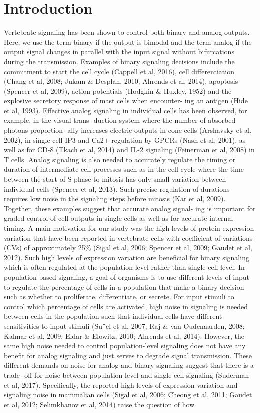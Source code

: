 \section{Introduction}
Vertebrate signaling has been shown to control both binary and analog outputs. Here, we use the term binary if the output is bimodal and the term analog if the output signal changes in parallel with the input signal without bifurcations during the transmission. Examples of binary signaling decisions include the commitment to start the cell cycle (Cappell et al, 2016), cell differentiation (Chang et al, 2008; Jukam & Desplan, 2010; Ahrends et al, 2014), apoptosis
(Spencer et al, 2009), action potentials (Hodgkin & Huxley, 1952) and the explosive secretory response of mast cells when encounter- ing an antigen (Hide et al, 1993). Effective analog signaling in individual cells has been observed, for example, in the visual trans- duction system where the number of absorbed photons proportion- ally increases electric outputs in cone cells (Arshavsky et al, 2002), in single-cell IP3 and Ca2+ regulation by GPCRs (Nash et al, 2001), as well as for CD-8 (Tkach et al, 2014) and IL-2 signaling (Feinerman et al, 2008) in T cells. Analog signaling is also needed to accurately regulate the timing or duration of intermediate cell processes such as in the cell cycle where the time between the start of S-phase to mitosis has only small variation between individual cells (Spencer et al, 2013). Such precise regulation of durations requires low noise in the signaling steps before mitosis (Kar et al, 2009). Together, these examples suggest that accurate analog signal- ing is important for graded control of cell outputs in single cells as well as for accurate internal timing. A main motivation for our study was the high levels of protein expression variation that have been reported in vertebrate cells with coefficient of variations (CVs) of approximately 25\% (Sigal et al, 2006; Spencer et al, 2009; Gaudet et al, 2012). Such high levels of expression variation are beneficial for binary signaling which is often regulated at the population level rather than single-cell level. In population-based signaling, a goal of organisms is to use different levels of input to regulate the percentage of cells in a population that make a binary decision such as whether to proliferate, differentiate, or secrete. For input stimuli to control which percentage of cells are activated, high noise in signaling is needed between cells in the population such that individual cells have different sensitivities to input stimuli (Su¨el et al, 2007; Raj & van Oudenaarden, 2008; Kalmar et al, 2009; Eldar & Elowitz, 2010; Ahrends et al, 2014). However, the same high noise needed to control population-level signaling does not have any benefit for analog signaling and just serves to degrade signal transmission. These different demands on noise for analog and binary signaling suggest that there is a trade- off for noise between population-level and single-cell signaling (Suderman et al, 2017). Specifically, the reported high levels of expression variation and signaling noise in mammalian cells (Sigal et al, 2006; Cheong et al, 2011; Gaudet et al, 2012; Selimkhanov et al, 2014) raise the question of how 